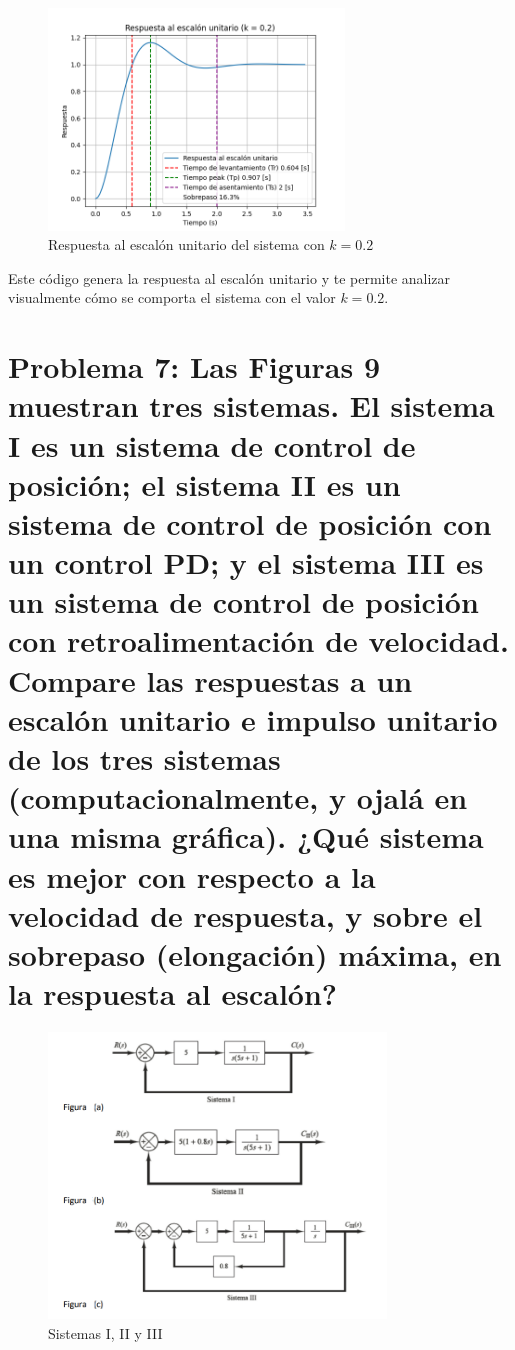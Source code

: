 \documentclass[10pt]{article}
\theoremstyle{definition}
\theoremstyle{remark}
\theoremstyle{definition}
\numberwithin{equation}{prob}
\begin{document}
\begin{figure}[h]
	\centering
	\includegraphics[width=0.7\textwidth]{./figures/Figura 8 ejercicio 6.png}
	\caption{Respuesta al escalón unitario del sistema con \(k = 0.2\)}
\end{figure}


Este código genera la respuesta al escalón unitario y te permite analizar visualmente cómo se comporta el sistema con el valor \(k = 0.2\).

\section{Problema 7: Las Figuras 9 muestran tres sistemas. El sistema I es un sistema de control de posición; el
  sistema II es un sistema de control de posición con un control PD; y el sistema III es un sistema
  de control de posición con retroalimentación de velocidad.
  Compare las respuestas a un escalón unitario e impulso unitario de los tres sistemas (computacionalmente, y ojalá en una misma gráfica). ¿Qué sistema es mejor con respecto a la velocidad
  de respuesta, y sobre el sobrepaso (elongación) máxima, en la respuesta al escalón? }


\begin{figure}[h]
	\centering
	\includegraphics[width=0.8\textwidth]{./figures/Figura 9 ejercicio 7.png}
	\caption{Sistemas I, II y III}
\end{figure}
\end{document}
